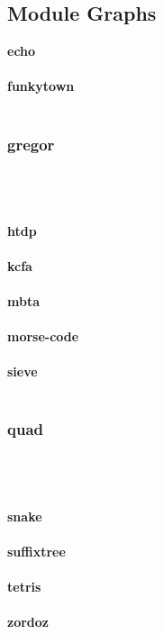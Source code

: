 \documentclass{article}
\newcommand{\pict}[1]{{\bf #1}\hfill{}\hfill{}\\\vspace{1cm}\\}
\newcommand{\largepict}[1]{\subsubsection*{#1}\\\\\vspace{1cm}\\}
\begin{document}
\subsection*{Module Graphs}

\pict{echo}
\pict{funkytown}
\largepict{gregor}
\pict{htdp}
\pict{kcfa}
\pict{mbta}
\pict{morse-code}
\pict{sieve}
\largepict{quad}
\pict{snake}
\pict{suffixtree}
\pict{tetris}
\pict{zordoz}
\end{document}
